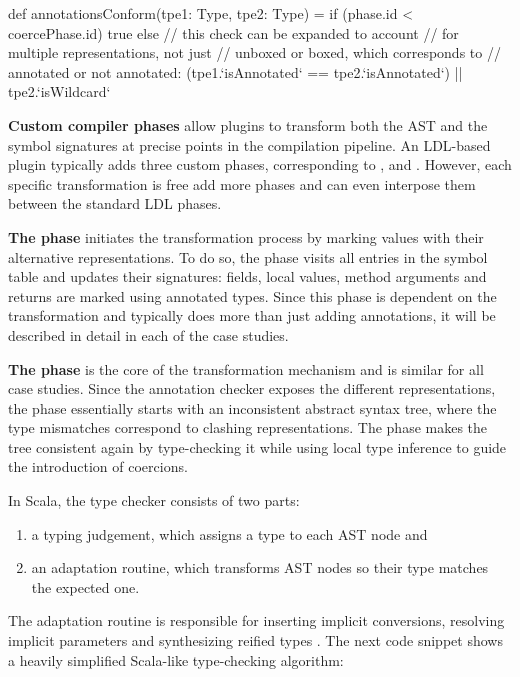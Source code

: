 \begin{lstlisting-nobreak}
 def annotationsConform(tpe1: Type, tpe2: Type) =
   if (phase.id < coercePhase.id)
     true
   else
     // this check can be expanded to account
     // for multiple representations, not just
     // unboxed or boxed, which corresponds to
     // annotated or not annotated:
     (tpe1.`isAnnotated` == tpe2.`isAnnotated`) || tpe2.`isWildcard`
\end{lstlisting-nobreak}

\textbf{Custom compiler phases} allow plugins to transform both the AST and the symbol signatures at precise points in the compilation pipeline. An LDL-based plugin typically adds three custom phases, corresponding to \inject{}, \coerce{} and \commit{}. However, each specific transformation is free add more phases and can even interpose them between the standard LDL phases.

\textbf{The \inject{} phase} initiates the transformation process by marking values with their alternative representations. To do so, the phase visits all entries in the symbol table and updates their signatures: fields, local values, method arguments and returns are marked using annotated types. Since this phase is dependent on the transformation and typically does more than just adding annotations, it will be described in detail in each of the case studies.

\textbf{The \coerce{} phase} is the core of the transformation mechanism and is similar for all case studies. Since the annotation checker exposes the different representations, the \coerce{} phase essentially starts with an inconsistent abstract syntax tree, where the type mismatches correspond to clashing representations. The \coerce{} phase makes the tree consistent again by type-checking it while using local type inference to guide the introduction of coercions.

In Scala, the type checker consists of two parts:
\begin{enumerate}
\item a typing judgement, which assigns a type to each AST node and
\item an adaptation routine, which transforms AST nodes so their type matches the expected one.
\end{enumerate}

The adaptation routine is responsible for inserting implicit conversions, resolving implicit parameters and synthesizing reified types \cite{michel-thesis}. The next code snippet shows a heavily simplified Scala-like type-checking algorithm:

